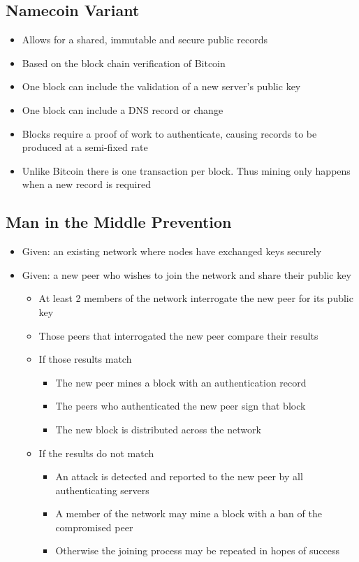 \documentclass{IEEEtran}
\begin{document}
\subsection{Namecoin Variant}

\begin{itemize}
\item
  Allows for a shared, immutable and secure public records
\item
  Based on the block chain verification of Bitcoin
\item
  One block can include the validation of a new server's public key
\item
  One block can include a DNS record or change
\item
  Blocks require a proof of work to authenticate, causing records to be
  produced at a semi-fixed rate
\item
  Unlike Bitcoin there is one transaction per block. Thus mining only
  happens when a new record is required
\end{itemize}
\subsection{Man in the Middle Prevention}

\begin{itemize}
\item
  Given: an existing network where nodes have exchanged keys securely
\item
  Given: a new peer who wishes to join the network and share their
  public key
  \begin{itemize}
  \item
    At least 2 members of the network interrogate the new peer for its
    public key
  \item
    Those peers that interrogated the new peer compare their results
  \item
    If those results match
    \begin{itemize}
    \item
      The new peer mines a block with an authentication record
    \item
      The peers who authenticated the new peer sign that block
    \item
      The new block is distributed across the network
    \end{itemize}
  \item
    If the results do not match
    \begin{itemize}
    \item
      An attack is detected and reported to the new peer by all
      authenticating servers
    \item
      A member of the network may mine a block with a ban of the
      compromised peer
    \item
      Otherwise the joining process may be repeated in hopes of success
    \end{itemize}
  \end{itemize}
\end{itemize}
\end{document}
